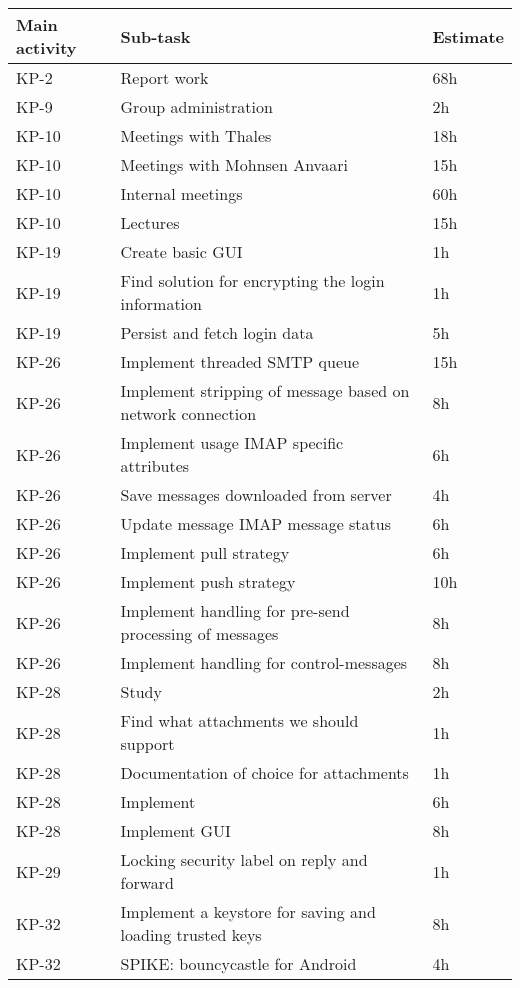 \begin{longtable}{>{\setlength\hsize{.2\hsize}}X|>{\setlength\hsize{1.5\hsize}}X|>{\setlength\hsize{.1\hsize}}X}
\textbf{Main activity} &  \textbf{Sub-task} & \textbf{Estimate}\\ \hline \hline
KP-2 & Report work & 68h\\ \hline
KP-9 & Group administration & 2h\\ \hline
KP-10 & Meetings with Thales & 18h\\ \hline
KP-10 & Meetings with Mohnsen Anvaari & 15h\\ \hline
KP-10 & Internal meetings & 60h\\ \hline
KP-10 & Lectures & 15h\\ \hline
KP-19	& Create basic GUI & 1h\\ \hline
KP-19	& Find solution for encrypting the login information & 1h\\ \hline
KP-19	& Persist and fetch login data & 5h\\ \hline
KP-26 & Implement threaded SMTP queue & 15h\\ \hline
KP-26 & Implement stripping of message based on network connection & 8h\\ \hline
KP-26	& Implement usage IMAP specific attributes & 6h\\ \hline
KP-26 & Save messages downloaded from server & 4h\\ \hline
KP-26 & Update message IMAP message status & 6h\\ \hline
KP-26 & Implement pull strategy & 6h\\ \hline
KP-26 & Implement push strategy & 10h\\ \hline
KP-26 & Implement handling for pre-send processing of messages & 8h\\ \hline
KP-26 & Implement handling for control-messages & 8h\\ \hline
KP-28	& Study & 2h\\ \hline
KP-28	& Find what attachments we should support & 1h\\ \hline
KP-28	& Documentation of choice for attachments & 1h\\ \hline
KP-28 & Implement & 6h\\ \hline
KP-28 & Implement GUI & 8h\\ \hline
KP-29	& Locking security label on reply and forward & 1h\\ \hline
KP-32	& Implement a keystore for saving and loading trusted keys & 8h\\ \hline
KP-32 & SPIKE: bouncycastle for Android & 4h\\ \hline

\end{longtable}
